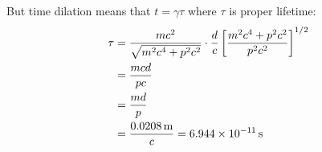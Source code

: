 \begin{parts}
	But time dilation means that $t = \gamma\tau$ where $\tau$ is proper lifetime:
	\begin{align*}
		\tau &= \frac{mc^2}{\sqrt{m^2 c^4 + p^2 c^2}} \cdot \frac{d}{c} \left[\frac{m^2 c^4 + p^2 c^2}{p^2 c^2}\right]^{1/2} \\
		&= \frac{mcd}{pc} \\
		&= \frac{md}{p} \\
		&= \frac{\SI{0.0208}{\metre}}{c} = \SI{6.944e-11}{\second}
	\end{align*}
\end{parts}